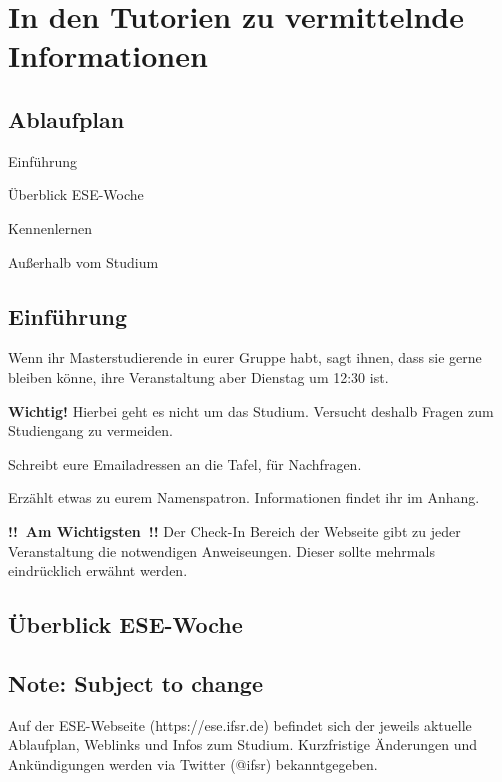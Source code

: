 \documentclass[a4paper,12pt]{scrreprt}
\begin{document}
\chapter{In den Tutorien zu vermittelnde Informationen}

\section{Ablaufplan}

\begin{itemize*}
    \item Einführung
    \item Überblick ESE-Woche
    \item Kennenlernen
    \item Außerhalb vom Studium
\end{itemize*}

\section{Einführung}
\begin{itemize*}
    \item Wenn ihr Masterstudierende in eurer Gruppe habt, sagt ihnen, dass sie gerne bleiben könne, ihre Veranstaltung aber Dienstag um 12:30 ist.
    \item \textbf{Wichtig!} Hierbei geht es nicht um das Studium. Versucht deshalb Fragen zum Studiengang zu vermeiden.
    \item Schreibt eure Emailadressen an die Tafel, für Nachfragen.
    \item Erzählt etwas zu eurem Namenspatron. Informationen findet ihr im Anhang.
    \item \textbf{!!~Am Wichtigsten~!!} Der Check-In Bereich der Webseite gibt zu jeder Veranstaltung die notwendigen Anweiseungen. Dieser sollte mehrmals eindrücklich erwähnt werden.
\end{itemize*}

\pagebreak

\section{Überblick ESE-Woche}


\section{Note: Subject to change}



\begin{framed}
Auf der ESE-Webseite (https://ese.ifsr.de) befindet sich der jeweils aktuelle Ablaufplan, Weblinks und Infos zum Studium. Kurzfristige Änderungen und Ankündigungen werden via Twitter (@ifsr) bekanntgegeben.
\end{framed}
\end{document}
